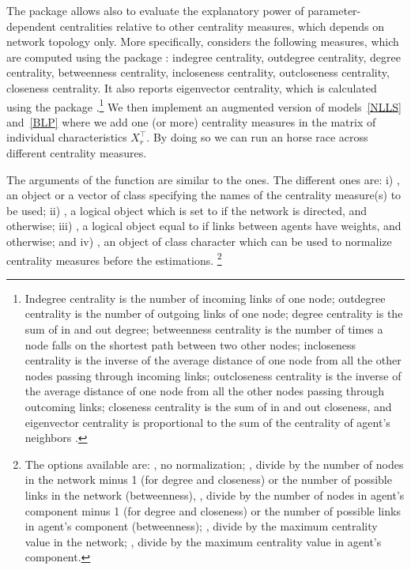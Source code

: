 \documentclass[nojss]{jss}
\begin{document}
	The  package  allows also to evaluate the explanatory power of parameter-dependent centralities relative to other centrality measures, which depends on network topology only. More specifically,  considers the following measures, which are computed using the  package  \citep{igraph}: indegree centrality, outdegree centrality, degree centrality, betweenness centrality, incloseness centrality, outcloseness centrality, closeness centrality. It also reports eigenvector centrality, which is calculated using the  package  \citep{sna}.\footnote{Indegree centrality is the number of incoming links of one node; outdegree centrality is the number of outgoing links of one node; degree centrality is the sum of in and out degree; betweenness centrality is the number of times a node falls on the shortest path between two other nodes; incloseness centrality is the inverse of the average distance of one node from all the other nodes passing through incoming links; outcloseness centrality is the inverse of the average distance of one node from all the other nodes passing through outcoming links; closeness centrality is the sum of in and out closeness, and eigenvector centrality is proportional to the sum of the centrality of agent's neighbors \cite[see][for further details]{Jackson:2010}.}
	We then implement an augmented version of models~\ref{NLLS} and~\ref{BLP} where we add one (or more) centrality measures in the matrix of individual characteristics $X_{r}^\top.$ By doing so we can run an horse race across different centrality measures.
	
	The arguments of the function  are similar to the  ones. The different ones are: i) , an object or a vector of class  specifying the names of the centrality measure(s) to be used; ii) , a logical object
	which is set to  if the network is directed, and  otherwise; iii) , a logical object equal to  if links between agents have weights, and  otherwise; and iv) , an object
	of class character which can be used to normalize centrality measures before the estimations. \footnote{The options available are: , no normalization; , divide by the number of nodes in the network minus 1 (for degree and closeness) or the number of possible links in the network (betweenness), , divide by the number of nodes in agent's component minus 1 (for degree and closeness) or the number of possible links in agent's component (betweenness); , divide by the maximum centrality value in the network; , divide by the maximum centrality value in agent's component.}
	
\end{document}
